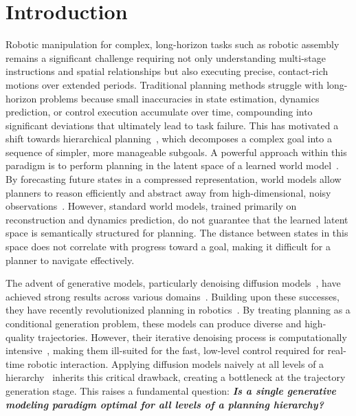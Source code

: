 \documentclass{article} %
\begin{document}
\section{Introduction}
\vspace{-8pt}
Robotic manipulation for complex, long-horizon tasks such as robotic assembly~\cite{kimble2020benchmarking,suarez2016framework,lee2021ikea,heo2025furniturebench,ankile2024juicer,ankile2024imitation} remains a significant challenge requiring not only understanding multi-stage instructions and spatial relationships but also executing precise, contact-rich motions over extended periods. Traditional planning methods struggle with long-horizon problems because small inaccuracies in state estimation, dynamics prediction, or control execution accumulate over time, compounding into significant deviations that ultimately lead to task failure. This has motivated a shift towards hierarchical planning~\citep{sacerdoti1974planning,knoblock,singh,kaelbling2011hierarchical}, which decomposes a complex goal into a sequence of simpler, more manageable subgoals. A powerful approach within this paradigm is to perform planning in the latent space of a learned world model~\citep{ha2018world,pmlr-v97-hafner19a,Hafner2020Dream}. By forecasting future states in a compressed representation, world models allow planners to reason efficiently and abstract away from high-dimensional, noisy observations~\citep{hafner2022deep,Wang2020Exploring}. However, standard world models, trained primarily on reconstruction and dynamics prediction, do not guarantee that the learned latent space is semantically structured for planning. The distance between states in this space does not correlate with progress toward a goal, making it difficult for a planner to navigate effectively.

The advent of generative models, particularly denoising diffusion models~\citep{sohl2015deep,ho2020denoising,song2021scorebased}, have achieved strong results across various domains~\citep{nichol2022glide,9578791,li2022diffusionlm,gupta2024photorealistic,avdeyev2023dirichlet}. Building upon these successes, they have recently revolutionized planning in robotics~\citep{janner2022planning,ajayconditional,lumakes}. By treating planning as a conditional generation problem, these models can produce diverse and high-quality trajectories. However, their iterative denoising process is computationally intensive~\citep{dong2024diffuserlite}, making them ill-suited for the fast, low-level control required for real-time robotic interaction. Applying diffusion models naively at all levels of a hierarchy~\citep{chensimple,li2023hierarchical,hao2025chd} inherits this critical drawback, creating a bottleneck at the trajectory generation stage. This raises a fundamental question: \textbf{\textit{Is a single generative modeling paradigm optimal for all levels of a planning hierarchy?}}
\end{document}
